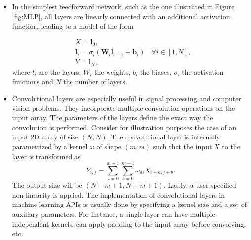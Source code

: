\begin{itemize}
    \item In the simplest feedforward network, such as the one illustrated in Figure \ref{fig:MLP}, all layers are linearly connected with an additional activation function, leading to a model of the form

    \begin{equation}
        \begin{aligned}
            &X=\boldsymbol{l}_{0}, \\
            &\boldsymbol{l}_{i}=\sigma_{i}(\boldsymbol{W}_{i}\boldsymbol{l}_{i-1}+\boldsymbol{b}_{i})\quad\forall i\in[1,N], \\
            &Y=\boldsymbol{l}_{N},
        \end{aligned}
    \end{equation}
    where $l_i$ are the layers, $W_i$ the weights, $b_i$ the biases, $\sigma_i$ the activation functions and $N$ the number of layers.
    
    
    \item Convolutional layers are especially useful in signal processing and computer vision problems. They incorporate multiple convolution operations on the input array. The parameters of the layers define the exact way the convolution is performed. Consider for illustration purposes the case of an input 2D array of size $(N, N)$. The convolutional layer is internally parametrized by a kernel $\omega$ of shape $(m,m)$ such that the input $X$ to the layer is transformed as
    \begin{equation}
        Y_{i,j}=\sum_{a=0}^{m-1} \sum_{b=0}^{m-1} \omega_{ab} X_{i+a,j+b}.
    \end{equation}
    The output size will be $(N-m+1, N-m+1)$. Lastly, a user-specified non-linearity is applied. The implementation of convolutional layers in machine learning APIs is usually done by specifying a kernel size and a set of auxiliary parameters. For instance, a single layer can have multiple independent kernels, can apply padding to the input array before convolving, etc.


\end{itemize}
